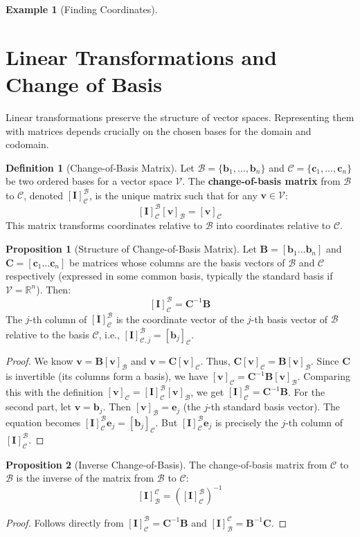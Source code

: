 \documentclass[12pt, letterpaper]{article}
\theoremstyle{definition}
\newtheorem{definition}{Definition}[section]
\newtheorem{proposition}{Proposition}[section]
\newtheorem{example}{Example}[section]
\newcommand{\R}{\mathbb{R}}
\newcommand{\V}{\mathcal{V}}
\newcommand{\B}{\mathcal{B}}
\newcommand{\C}{\mathcal{C}}
\newcommand{\mat}[1]{\mathbf{#1}} %
\newcommand{\vect}[1]{\mathbf{#1}} %
\renewcommand{\v}{\vect{v}} %
\newcommand{\e}{\vect{e}} %
\newcommand{\bvec}{\vect{b}} %
\begin{document}
\begin{example}[Finding Coordinates]
\end{example}

\section{Linear Transformations and Change of Basis}

Linear transformations preserve the structure of vector spaces. Representing them with matrices depends crucially on the chosen bases for the domain and codomain.

\begin{definition}[Change-of-Basis Matrix]
Let $\B = \{\bvec_1, \dots, \bvec_n\}$ and $\C = \{\vect{c}_1, \dots, \vect{c}_n\}$ be two ordered bases for a vector space $\V$. The \textbf{change-of-basis matrix} from $\B$ to $\C$, denoted $[\mat{I}]_\C^\B$, is the unique matrix such that for any $\v \in \V$:
\[ [\mat{I}]_\C^\B [\v]_\B = [\v]_\C \]
This matrix transforms coordinates relative to $\B$ into coordinates relative to $\C$.
\end{definition}

\begin{proposition}[Structure of Change-of-Basis Matrix]
Let $\mat{B} = [\bvec_1 \dots \bvec_n]$ and $\mat{C} = [\vect{c}_1 \dots \vect{c}_n]$ be matrices whose columns are the basis vectors of $\B$ and $\C$ respectively (expressed in some common basis, typically the standard basis if $\V = \R^n$). Then:
\[ [\mat{I}]_\C^\B = \mat{C}^{-1} \mat{B} \]
The $j$-th column of $[\mat{I}]_\C^\B$ is the coordinate vector of the $j$-th basis vector of $\B$ relative to the basis $\C$, i.e., $[\mat{I}]_{\C, j}^\B = [\bvec_j]_\C$.
\end{proposition}
\begin{proof}
We know $\v = \mat{B} [\v]_\B$ and $\v = \mat{C} [\v]_\C$. Thus, $\mat{C} [\v]_\C = \mat{B} [\v]_\B$. Since $\mat{C}$ is invertible (its columns form a basis), we have $[\v]_\C = \mat{C}^{-1} \mat{B} [\v]_\B$. Comparing this with the definition $[\v]_\C = [\mat{I}]_\C^\B [\v]_\B$, we get $[\mat{I}]_\C^\B = \mat{C}^{-1} \mat{B}$.
For the second part, let $\v = \bvec_j$. Then $[\v]_\B = \e_j$ (the $j$-th standard basis vector). The equation becomes $[\mat{I}]_\C^\B \e_j = [\bvec_j]_\C$. But $[\mat{I}]_\C^\B \e_j$ is precisely the $j$-th column of $[\mat{I}]_\C^\B$.
\end{proof}

\begin{proposition}[Inverse Change-of-Basis]
The change-of-basis matrix from $\C$ to $\B$ is the inverse of the matrix from $\B$ to $\C$:
\[ [\mat{I}]_\B^\C = ([\mat{I}]_\C^\B)^{-1} \]
\end{proposition}
\begin{proof}
Follows directly from $[\mat{I}]_\C^\B = \mat{C}^{-1} \mat{B}$ and $[\mat{I}]_\B^\C = \mat{B}^{-1} \mat{C}$.
\end{proof}
\end{document}
